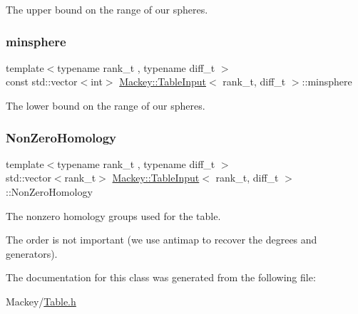 The upper bound on the range of our spheres. 

\mbox{\label{classMackey_1_1TableInput_a3f4bf3973cebe4bc2d305d111fa8b478}} 
\subsubsection{\texorpdfstring{minsphere}{minsphere}}
{\footnotesize\ttfamily template$<$typename rank\+\_\+t , typename diff\+\_\+t $>$ \\
const std\+::vector$<$int$>$ \hyperlink{classMackey_1_1TableInput}{Mackey\+::\+Table\+Input}$<$ rank\+\_\+t, diff\+\_\+t $>$\+::minsphere\hspace{0.3cm}{\ttfamily [protected]}}



The lower bound on the range of our spheres. 

\mbox{\label{classMackey_1_1TableInput_a1f61296eba16c62517e325d21e7a5505}} 
\subsubsection{\texorpdfstring{Non\+Zero\+Homology}{NonZeroHomology}}
{\footnotesize\ttfamily template$<$typename rank\+\_\+t , typename diff\+\_\+t $>$ \\
std\+::vector$<$rank\+\_\+t$>$ \hyperlink{classMackey_1_1TableInput}{Mackey\+::\+Table\+Input}$<$ rank\+\_\+t, diff\+\_\+t $>$\+::Non\+Zero\+Homology\hspace{0.3cm}{\ttfamily [protected]}}



The nonzero homology groups used for the table. 

The order is not important (we use antimap to recover the degrees and generators). 

The documentation for this class was generated from the following file\+:\begin{DoxyCompactItemize}
\item 
Mackey/\hyperlink{Table_8h}{Table.\+h}\end{DoxyCompactItemize}
